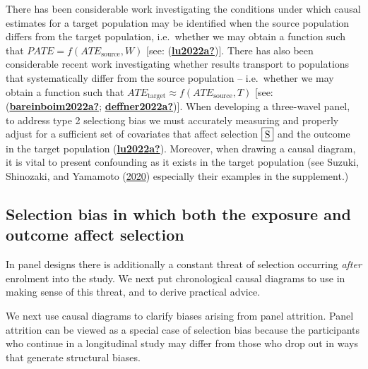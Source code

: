 \documentclass[
  singlecolumn]{report}
\begin{document}
There has been considerable work investigating the conditions under
which causal estimates for a target population may be identified when
the source population differs from the target population, i.e.~whether
we may obtain a function such that \(PATE = f(ATE_{\text{source}}, W)\)
{[}see: (\protect\hyperlink{ref-lu2022a}{\textbf{lu2022a?}}){]}. There
has also been considerable recent work investigating whether results
transport to populations that systematically differ from the source
population -- i.e.~whether we may obtain a function such that
\(ATE_{\text{target}} \approx f(ATE_{\text{source}}, T)\) {[}see:
(\protect\hyperlink{ref-bareinboim2022a}{\textbf{bareinboim2022a?}};
\protect\hyperlink{ref-deffner2022a}{\textbf{deffner2022a?}}){]}. When
developing a three-wavel panel, to address type 2 selectiong bias we
must accurately measuring and properly adjust for a sufficient set of
covariates that affect selection \(\framebox{S}\) and the outcome in the
target population (\protect\hyperlink{ref-lu2022a}{\textbf{lu2022a?}}).
Moreover, when drawing a causal diagram, it is vital to present
confounding as it exists in the target population (see Suzuki,
Shinozaki, and Yamamoto (\protect\hyperlink{ref-suzuki2020}{2020})
especially their examples in the supplement.)

\hypertarget{selection-bias-in-which-both-the-exposure-and-outcome-affect-selection}{%
\subsection{Selection bias in which both the exposure and outcome affect
selection}\label{selection-bias-in-which-both-the-exposure-and-outcome-affect-selection}}

In panel designs there is additionally a constant threat of selection
occurring \emph{after} enrolment into the study. We next put
chronological causal diagrams to use in making sense of this threat, and
to derive practical advice.

We next use causal diagrams to clarify biases arising from panel
attrition. Panel attrition can be viewed as a special case of selection
bias because the participants who continue in a longitudinal study may
differ from those who drop out in ways that generate structural biases.
\end{document}
